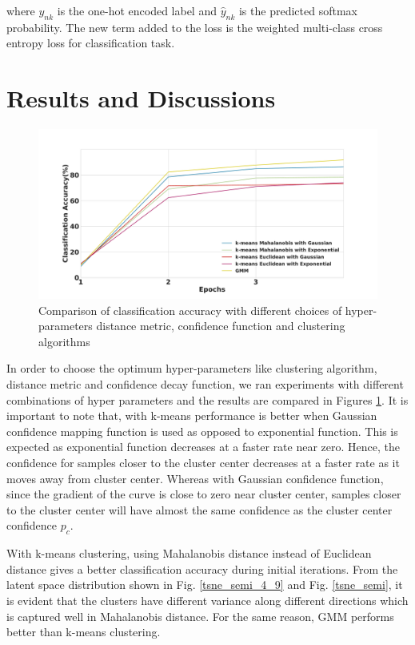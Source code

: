 \documentclass[runningheads]{llncs}
\begin{document}
where $y_{nk}$ is the one-hot encoded label and $\hat{y}_{nk}$ is the predicted softmax probability.
The new term added to the loss is the weighted multi-class cross entropy loss for classification task.

\section{Results and Discussions}

\begin{figure}[!t]
\centering
  \centering
  \includegraphics[width=.7\linewidth]{images/classification_accuracy_hyperparameter}
\caption{Comparison of classification accuracy with different choices of hyper-parameters distance metric, confidence function and clustering algorithms}
\label{classification_acc}
\end{figure}

In order to choose the optimum hyper-parameters like clustering algorithm, distance metric and confidence decay function, we ran experiments with different combinations of hyper parameters and the results are compared in Figures \ref{classification_acc}.
It is important to note that, with k-means performance is better when Gaussian confidence mapping function is used as opposed to exponential function.
This is expected as exponential function decreases at a faster rate near zero.
Hence, the confidence for samples closer to the cluster center decreases at a faster rate as it moves away from cluster center.
Whereas  with Gaussian confidence function, since the gradient of the curve is close to zero near cluster center, samples closer to the cluster center will have almost the same confidence as the cluster center confidence $p_c$.

With k-means clustering, using Mahalanobis distance instead of Euclidean distance gives a better classification accuracy during initial iterations.
From the latent space distribution shown in Fig. \ref{tsne_semi_4_9} and Fig. \ref{tsne_semi}, it is evident that the clusters have different variance along different directions which is captured well in Mahalanobis distance.
For the same reason, GMM performs better than k-means clustering.
\end{document}
